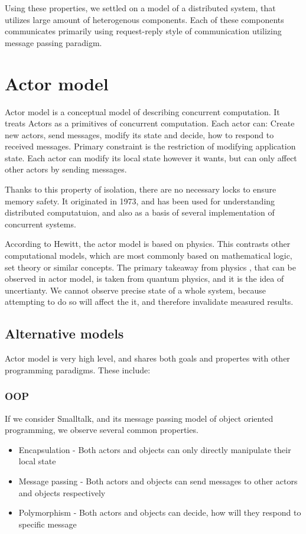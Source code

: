 Using these properties, we settled on a model of a distributed system, that utilizes large amount of heterogenous components.
Each of these components communicates primarily using request-reply style of communication utilizing message passing paradigm.

\section{Actor model}
Actor model is a conceptual model of describing concurrent computation. It treats Actors as a primitives of concurrent
computation. Each actor can: Create new actors, send messages, modify its state and decide, how to respond to
received messages. Primary constraint is the restriction of modifying application state.
Each actor can modify its local state however it wants, but can only affect other actors by sending messages.

Thanks to this property of isolation, there are no necessary locks to ensure memory safety.
It originated in 1973, and has been used for understanding distributed computatuion, and also as
a basis of several implementation of concurrent systems.

According to Hewitt\cite{journal:actor}, the actor model is based on physics. This contrasts
other computational models, which are most commonly based on mathematical logic, set theory or similar concepts.
The primary takeaway from physics , that can be observed in actor model, is taken from quantum physics, and it
is the idea of uncertianty. We cannot observe precise state of a whole system, because attempting to do so
will affect the it, and therefore invalidate measured results.

\subsection{Alternative models}
Actor model is very high level, and shares both goals and propertes with other programming paradigms. These
include:
\subsubsection{OOP}
If we consider Smalltalk, and its message passing model of object oriented programming, we observe several common properties.
\begin{itemize}
    \item Encapsulation - Both actors and objects can only directly manipulate their local state
    \item Message passing - Both actors and objects can send messages to other actors and objects respectively
    \item Polymorphism - Both actors and objects can decide, how will they respond to specific message
\end{itemize}

